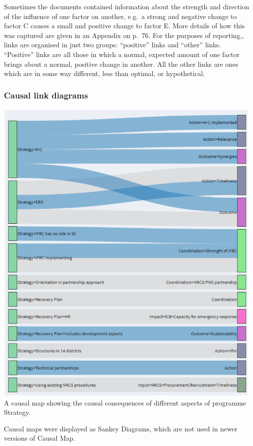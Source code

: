 \documentclass[
]{book}
\begin{document}
Sometimes the documents contained information about the strength and direction of the
influence of one factor on another, e.g.~a strong and negative change to factor C causes a
small and positive change to factor E. More details of how this was captured are given in
an Appendix on p.~76. For the purposes of reporting,, links are organised in just two
groups: ``positive'' links and ``other'' links. ``Positive'' links are all those in which a normal,
expected amount of one factor brings about a normal, positive change in another. All the
other links are ones which are in some way different, less than optimal, or hypothetical.

\hypertarget{causal-link-diagrams}{%
\subsubsection{Causal link diagrams}\label{causal-link-diagrams}}

\includegraphics{_assets/19e34962dab6bd291d2b0de83a90478a.png}A causal map showing the causal consequences of different aspects of programme Strategy.

Causal maps were displayed as Sankey Diagrams, which are not used in newer versions of Causal Map.
\end{document}
